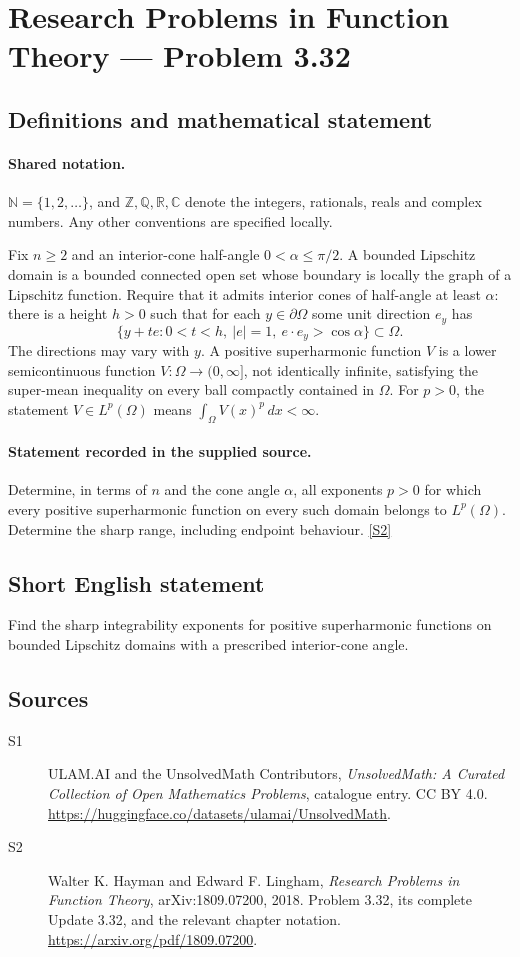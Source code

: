 \documentclass[11pt]{book}
\newcommand{\sref}[2]{\hyperlink{source:#1:#2}{[S#2]}}
\begin{document}
\section{Research Problems in Function Theory — Problem 3.32}\label{statement}

\subsection{Definitions and mathematical statement}

\paragraph{Shared notation.}$\mathbb N=\{1,2,\ldots\}$, and $\mathbb Z,\mathbb Q,\mathbb R,\mathbb C$ denote the integers, rationals, reals and complex numbers. Any other conventions are specified locally.


Fix $n\ge2$ and an interior-cone half-angle $0<\alpha\le\pi/2$. A bounded Lipschitz domain is a bounded connected open set whose boundary is locally the graph of a Lipschitz function. Require that it admits interior cones of half-angle at least $\alpha$: there is a height $h>0$ such that for each $y\in\partial\Omega$ some unit direction $e_y$ has
\[\{y+te:0<t<h,\ |e|=1,\ e\cdot e_y>\cos\alpha\}\subset\Omega.
\]
The directions may vary with $y$. A positive superharmonic function $V$ is a lower semicontinuous function $V:\Omega\to(0,\infty]$, not identically infinite, satisfying the super-mean inequality on every ball compactly contained in $\Omega$. For $p>0$, the statement $V\in L^p(\Omega)$ means $\int_\Omega V(x)^p\,dx<\infty$.
\paragraph{Statement recorded in the supplied source.}
Determine, in terms of $n$ and the cone angle $\alpha$, all exponents $p>0$ for which every positive superharmonic function on every such domain belongs to $L^p(\Omega)$. Determine the sharp range, including endpoint behaviour. \sref{statement}{2}
\subsection{Short English statement}
Find the sharp integrability exponents for positive superharmonic functions on bounded Lipschitz domains with a prescribed interior-cone angle.
\subsection{Sources}
\begin{description}
\item[\hypertarget{source:statement:1}{S1}] ULAM.AI and the UnsolvedMath Contributors, \emph{UnsolvedMath: A Curated Collection of Open Mathematics Problems}, catalogue entry. CC BY 4.0. \url{https://huggingface.co/datasets/ulamai/UnsolvedMath}.
\item[\hypertarget{source:statement:2}{S2}] Walter K. Hayman and Edward F. Lingham, \emph{Research Problems in Function Theory}, arXiv:1809.07200, 2018. Problem 3.32, its complete Update 3.32, and the relevant chapter notation. \url{https://arxiv.org/pdf/1809.07200}.
\end{description}
\label{end:statement}
\end{document}
